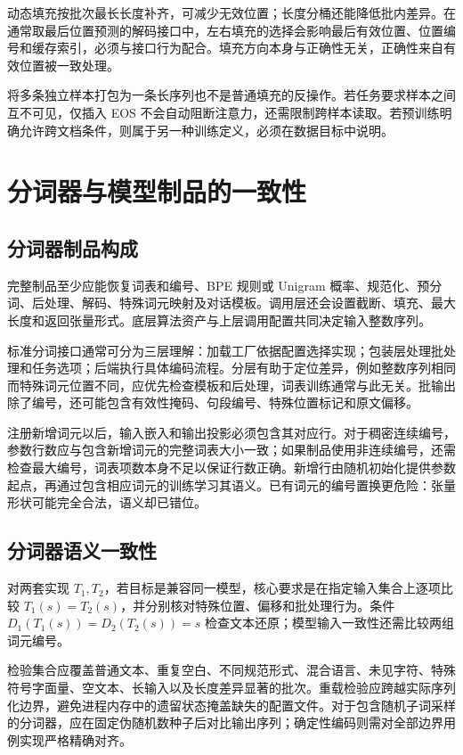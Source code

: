 \documentclass[../textbook.tex]{subfiles}
\begin{document}
动态填充按批次最长长度补齐，可减少无效位置；长度分桶还能降低批内差异。在通常取最后位置预测的解码接口中，左右填充的选择会影响最后有效位置、位置编号和缓存索引，必须与接口行为配合。填充方向本身与正确性无关，正确性来自有效位置被一致处理。

将多条独立样本打包为一条长序列也不是普通填充的反操作。若任务要求样本之间互不可见，仅插入 EOS 不会自动阻断注意力，还需限制跨样本读取。若预训练明确允许跨文档条件，则属于另一种训练定义，必须在数据目标中说明。

\section{分词器与模型制品的一致性}

\subsection{分词器制品构成}
完整制品至少应能恢复词表和编号、BPE 规则或 Unigram 概率、规范化、预分词、后处理、解码、特殊词元映射及对话模板。调用层还会设置截断、填充、最大长度和返回张量形式。底层算法资产与上层调用配置共同决定输入整数序列。

标准分词接口通常可分为三层理解：加载工厂依据配置选择实现；包装层处理批处理和任务选项；后端执行具体编码流程。分层有助于定位差异，例如整数序列相同而特殊词元位置不同，应优先检查模板和后处理，词表训练通常与此无关。批输出除了编号，还可能包含有效性掩码、句段编号、特殊位置标记和原文偏移。

注册新增词元以后，输入嵌入和输出投影必须包含其对应行。对于稠密连续编号，参数行数应与包含新增词元的完整词表大小一致；如果制品使用非连续编号，还需检查最大编号，词表项数本身不足以保证行数正确。新增行由随机初始化提供参数起点，再通过包含相应词元的训练学习其语义。已有词元的编号置换更危险：张量形状可能完全合法，语义却已错位。

\subsection{分词器语义一致性}
对两套实现 $T_1,T_2$，若目标是兼容同一模型，核心要求是在指定输入集合上逐项比较 $T_1(s)=T_2(s)$，并分别核对特殊位置、偏移和批处理行为。条件 $D_1(T_1(s))=D_2(T_2(s))=s$ 检查文本还原；模型输入一致性还需比较两组词元编号。

检验集合应覆盖普通文本、重复空白、不同规范形式、混合语言、未见字符、特殊符号字面量、空文本、长输入以及长度差异显著的批次。重载检验应跨越实际序列化边界，避免进程内存中的遗留状态掩盖缺失的配置文件。对于包含随机子词采样的分词器，应在固定伪随机数种子后对比输出序列；确定性编码则需对全部边界用例实现严格精确对齐。
\end{document}
